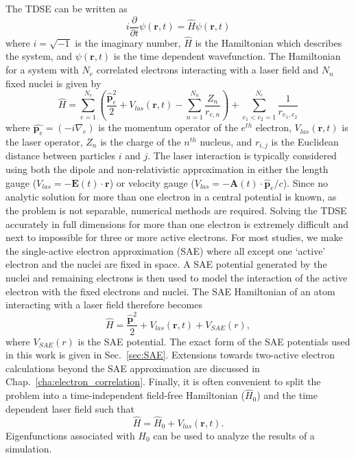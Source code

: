 The TDSE can be written as
\begin{equation}
    i\frac{\partial}{\partial t}\psi(\mathbf{r},t) = \hat{H}\psi(\mathbf{r},t)
    \label{eq:TDSE}
\end{equation}
where $i=\sqrt{-1}$ is the imaginary number, $\hat{H}$ is the Hamiltonian which describes the system, and $\psi(\mathbf{r},t)$ is the time dependent wavefunction. The Hamiltonian for a system with $N_e$ correlated electrons interacting with a laser field and $N_n$ fixed nuclei is given by
\begin{equation}
    \label{eq:atoms_and_molecules}
    \hat{H} = \sum_{e=1}^{N_e}\left(\frac{\hat{\mathbf{p}}^2_e}{2} + V_{las}(\mathbf{r},t) - \sum_{n=1}^{N_n} \frac{Z_n}{r_{e,n}}\right) + \sum_{e_1 < e_2=1}^{N_e}\frac{1}{r_{e_1, e_2}}
\end{equation}
where $\hat{\mathbf{p}_e}=(-i\nabla_e)$ is the momentum operator of the $e^{th}$ electron, $V_{las}(\mathbf{r},t)$ is the laser operator, $Z_n$ is the charge of the $n^{th}$ nucleus, and $r_{i,j}$ is the Euclidean distance between particles $i$ and $j$. The laser interaction is typically considered using both the dipole and non-relativistic approximation in either the length gauge ($V_{las} = - \mathbf{E}(t)\cdot \mathbf{r}$) or velocity gauge ($V_{las} = - \mathbf{A}(t)\cdot \hat{\mathbf{p}}_e / c$). Since no analytic solution for more than one electron in a central potential is known, as the problem is not separable, numerical methods are required. Solving the TDSE accurately in full dimensions for more than one electron is extremely difficult and next to impossible for three or more active electrons. For most studies, we make the single-active electron approximation (SAE) where all except one `active' electron and the nuclei are fixed in space. A SAE potential generated by the nuclei and remaining electrons is then used to model the interaction of the active electron with the fixed electrons and nuclei. The SAE Hamiltonian of an atom interacting with a laser field therefore becomes 
\begin{equation}
    \label{eq:SAE}
    \hat{H} = \frac{\hat{\mathbf{p}}^2}{2} + V_{las}(\mathbf{r},t) + V_{SAE}(r),
\end{equation}
where $V_{SAE}(r)$ is the SAE potential. The exact form of the SAE potentials used in this work is given in Sec.~\ref{sec:SAE}. Extensions towards two-active electron calculations beyond the SAE approximation are discussed in Chap.~\ref{cha:electron_correlation}. Finally, it is often convenient to split the problem into a time-independent field-free Hamiltonian ($\hat{H}_0$) and the time dependent laser field such that 
\begin{equation}
    \label{eq:field_free}
    \hat{H} = \hat{H}_0 + V_{las}(\mathbf{r},t).
\end{equation}
Eigenfunctions associated with $H_0$ can be used to analyze the results of a simulation. 



